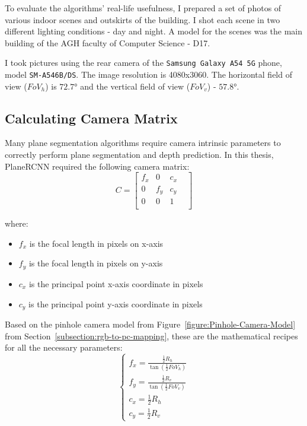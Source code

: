 To evaluate the algorithms' real-life usefulness,
I prepared a set of photos of various indoor scenes and outskirts of the building.
I shot each scene in two different lighting conditions - day and night.
A model for the scenes was the main building of the AGH faculty of Computer Science - D17.

\par

I took pictures using the rear camera of the \texttt{Samsung Galaxy A54 5G} phone, model \texttt{SM-A546B/DS}.
The image resolution is 4080x3060.
The horizontal field of view ($FoV_h$) is $\ang{72.7}$
and the vertical field of view ($FoV_v$) - $\ang{57.8}$. \cite{camera-fv-5-samsung-a54}

\subsection{Calculating Camera Matrix}

Many plane segmentation algorithms require camera intrinsic parameters
to correctly perform plane segmentation and depth prediction.
In this thesis, PlaneRCNN required the following camera matrix:
\begin{equation} \label{eq:camera-matrix}
	C = \begin{bmatrix}
		f_x &   0 & c_x & \\
		  0 & f_y & c_y & \\
		  0 &   0 &   1 & \\
	\end{bmatrix}
\end{equation}

where:
\begin{itemize}
\item $f_x$ is the focal length in pixels on x-axis
\item $f_y$ is the focal length in pixels on y-axis
\item $c_x$ is the principal point x-axis coordinate in pixels
\item $c_y$ is the principal point y-axis coordinate in pixels
\end{itemize}

Based on the pinhole camera model from Figure~\ref{figure:Pinhole-Camera-Model}
from Section~\ref{subsection:rgb-to-pc-mapping},
these are the mathematical recipes for all the necessary parameters:
\begin{equation} \label{eq:camera-intrinsic-parameters}
\begin{cases}
  f_x = \frac{\frac{1}{2}R_h}{\tan(\frac{1}{2}FoV_h)} \\
  f_y = \frac{\frac{1}{2}R_v}{\tan(\frac{1}{2}FoV_v)} \\
  c_x = \frac{1}{2}R_h \\
  c_y = \frac{1}{2}R_v
\end{cases}
\end{equation}

